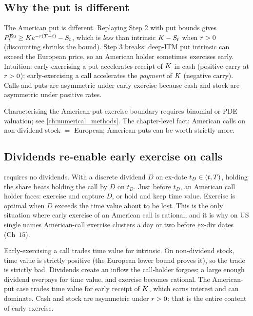 \subsection{Why the put is different}
\label{sec:ch14_amer_put}

The American put is different. Replaying Step 2 with put bounds
gives $P^{\mathrm{Eu}}_t \geq K e^{-r(T-t)} -
S_t$, which is \emph{less} than intrinsic
$K - S_t$ when $r > 0$ (discounting shrinks the
bound). Step 3 breaks: deep-ITM put intrinsic can exceed the
European price, so an American holder sometimes exercises
early. Intuition: early-exercising a put accelerates receipt of
$K$ in cash (positive carry at $r > 0$);
early-exercising a call accelerates the \emph{payment} of
$K$ (negative carry). Calls and puts are asymmetric
under early exercise because cash and stock are asymmetric
under positive rates.

Characterising the American-put exercise boundary requires
binomial or PDE valuation; see \cref{ch:numerical_methods}. The
chapter-level fact: American calls on non-dividend stock $=$
European; American puts can be worth strictly more.

\subsection{Dividends re-enable early exercise on calls}
\label{sec:ch14_amer_div}

 requires no dividends. With a
discrete dividend $D$ on ex-date $t_D \in (t, T)$, holding
the share beats holding the call by $D$ on $t_D$. Just before
$t_D$, an American call holder faces: exercise and capture $D$,
or hold and keep time value. Exercise is optimal when $D$
exceeds the time value about to be lost. This is the only
situation where early exercise of an American call is rational,
and it is why on US single names American-call exercise
clusters a day or two before ex-div dates \citeHull{}
(Ch~$15$).

\begin{intuitionbox}
Early-exercising a call trades time value for intrinsic. On
non-dividend stock, time value is strictly positive (the
European lower bound proves it), so the trade is strictly bad.
Dividends create an inflow the call-holder forgoes; a large
enough dividend overpays for time value, and exercise becomes
rational. The American-put case trades time value for early
receipt of $K$, which earns interest and can dominate.
Cash and stock are asymmetric under $r > 0$; that is the
entire content of early exercise.
\end{intuitionbox}

